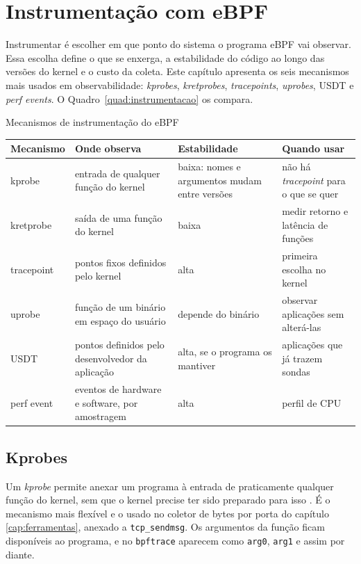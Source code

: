 \chapter{Instrumentação com eBPF}\label{cap:instrumentacao}

Instrumentar é escolher em que ponto do sistema o programa eBPF vai observar. Essa escolha define o que se enxerga, a estabilidade do código ao longo das versões do kernel e o custo da coleta. Este capítulo apresenta os seis mecanismos mais usados em observabilidade: \textit{kprobes}, \textit{kretprobes}, \textit{tracepoints}, \textit{uprobes}, USDT e \textit{perf events}. O Quadro~\ref{quad:instrumentacao} os compara.

\begin{quadro}[htb]
  \caption{Mecanismos de instrumentação do eBPF}
  \label{quad:instrumentacao}
  \small
  \begin{tabular}{@{}P{2.2cm}P{3.7cm}P{3.7cm}P{4.4cm}@{}}
    \toprule
    \textbf{Mecanismo} & \textbf{Onde observa} & \textbf{Estabilidade} & \textbf{Quando usar} \\
    \midrule
    kprobe & entrada de qualquer função do kernel & baixa: nomes e argumentos mudam entre versões & não há \textit{tracepoint} para o que se quer \\
    kretprobe & saída de uma função do kernel & baixa & medir retorno e latência de funções \\
    tracepoint & pontos fixos definidos pelo kernel & alta & primeira escolha no kernel \\
    uprobe & função de um binário em espaço do usuário & depende do binário & observar aplicações sem alterá-las \\
    USDT & pontos definidos pelo desenvolvedor da aplicação & alta, se o programa os mantiver & aplicações que já trazem sondas \\
    perf event & eventos de hardware e software, por amostragem & alta & perfil de CPU \\
    \bottomrule
  \end{tabular}
\end{quadro}

\section{Kprobes}

Um \textit{kprobe} permite anexar um programa à entrada de praticamente qualquer função do kernel, sem que o kernel precise ter sido preparado para isso \cite{linuxkernel2024}. É o mecanismo mais flexível e o usado no coletor de bytes por porta do capítulo \ref{cap:ferramentas}, anexado a \texttt{tcp\_sendmsg}. Os argumentos da função ficam disponíveis ao programa, e no \texttt{bpftrace} aparecem como \texttt{arg0}, \texttt{arg1} e assim por diante.

